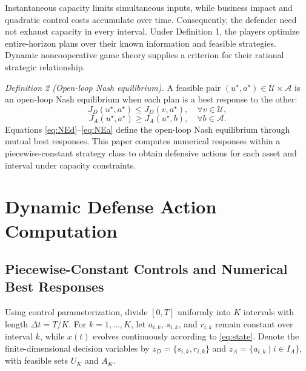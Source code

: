 \documentclass[conference,letterpaper]{IEEEtran}
\begin{document}
Instantaneous capacity limits simultaneous inputs, while business impact and quadratic control costs accumulate over time. Consequently, the defender need not exhaust capacity in every interval. Under Definition 1, the players optimize entire-horizon plans over their known information and feasible strategies. Dynamic noncooperative game theory\cite{r17} supplies a criterion for their rational strategic relationship.

\emph{Definition 2 (Open-loop Nash equilibrium).} A feasible pair $(u^\star,a^\star)\in\mathcal U\times\mathcal A$ is an open-loop Nash equilibrium when each plan is a best response to the other:
\begin{equation}\label{eq:NEd}
J_D(u^\star,a^\star)\le J_D(v,a^\star),\quad \forall v\in\mathcal U,
\end{equation}
\begin{equation}\label{eq:NEa}
J_A(u^\star,a^\star)\ge J_A(u^\star,b),\quad \forall b\in\mathcal A.
\end{equation}
Equations \eqref{eq:NEd}--\eqref{eq:NEa} define the open-loop Nash equilibrium through mutual best responses. This paper computes numerical responses within a piecewise-constant strategy class to obtain defensive actions for each asset and interval under capacity constraints.

\section{Dynamic Defense Action Computation}
\subsection{Piecewise-Constant Controls and Numerical Best Responses}
Using control parameterization\cite{r18}, divide $[0,T]$ uniformly into $K$ intervals with length $\Delta t=T/K$. For $k=1,\ldots,K$, let $a_{i,k}$, $s_{i,k}$, and $r_{i,k}$ remain constant over interval $k$, while $x(t)$ evolves continuously according to \eqref{eq:state}. Denote the finite-dimensional decision variables by $z_D=\{s_{i,k},r_{i,k}\}$ and $z_A=\{a_{i,k}\mid i\in I_A\}$, with feasible sets $U_K$ and $A_K$.
\end{document}
